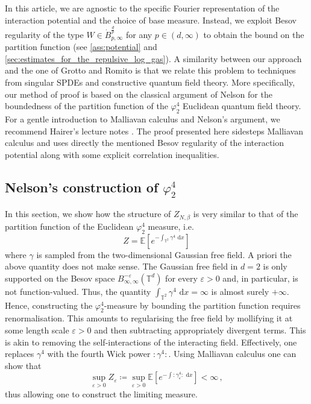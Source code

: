 \documentclass[a4paper,10pt,twoside]{amsart}
\newcommand{\dx}[1]{\,\mathrm{d}#1}  %
\theoremstyle{remark}
\theoremstyle{definition}
\numberwithin{equation}{section}
\newcommand{\T}{\mathbb{T}}
\newcommand{\eps}{\varepsilon}
\newcommand{\0}{{\bf 0}}
\newcommand{\+}{\hspace{-.5ex}+\hspace{-.5ex}}
\begin{document}
In this article, we are agnostic to the specific Fourier representation of the interaction potential and the choice of base measure. Instead, we exploit Besov regularity of the type $W\in \dot{B}^{\frac dp}_{p,\infty}$ for any $p\in(d,\infty)$ to obtain the bound on the partition function (see \cref{ass:potential} and \cref{sec:estimates_for_the_repulsive_log_gas}). A similarity between our approach and the one of Grotto and Romito \cite{grotto2020central} is that we relate this problem to techniques from singular SPDEs and constructive quantum field theory.  More specifically, our method of proof is based on the classical argument of Nelson \cite{nelson1966quartic} for the boundedness of the partition function of the $\varphi^4_2$ Euclidean quantum field theory. For a gentle introduction to Malliavan calculus and Nelson's argument, we recommend Hairer's lecture notes \cite{hairer2021introduction}. The proof presented here sidesteps Malliavan calculus and uses directly the mentioned Besov regularity of the interaction potential along with some explicit correlation inequalities. 


\subsection{Nelson's construction of \texorpdfstring{$\varphi^4_2$}{phi4\_2}} %
\label{sub:method_of_proof}
In this section, we show how the structure of $Z_{N,\beta}$ is very similar to that of the partition function of the Euclidean $\varphi^4_2$ measure, i.e.
\begin{equation}
  Z= \mathbb{E}\left[e^{-\int_{\T^2}\gamma^4 \, \dx{x}}\right]  
\end{equation}
where $\gamma$ is sampled from the two-dimensional Gaussian free field. A priori the above quantity does not make sense. The Gaussian free field in $d=2$ is only supported on the Besov space $B^{-\eps}_{\infty,\infty}(\T^d)$ for every $\eps>0$ and, in particular, is not function-valued. Thus, the quantity $\int_{\T^2}\gamma^4\, \dx{x}=\infty$  is almost surely $+\infty$. Hence, constructing the $\varphi^4_2$-measure by bounding the partition function requires renormalisation. This amounts to regularising the free field by mollifying it at some length scale $\eps>0$ and then subtracting appropriately divergent terms. This is akin to removing the self-interactions of the interacting field. Effectively, one replaces $\gamma^4$ with the fourth Wick power $:\gamma^4:$. Using Malliavan calculus one can show that
\begin{equation}
  \sup_{\eps>0}Z_\eps \coloneqq \sup_{\eps>0}\mathbb{E}\left[e^{- \int :\gamma_\eps^4:\, \dx{x}}\right] <\infty \, ,
\end{equation}
thus allowing one to construct the limiting measure.
\end{document}
